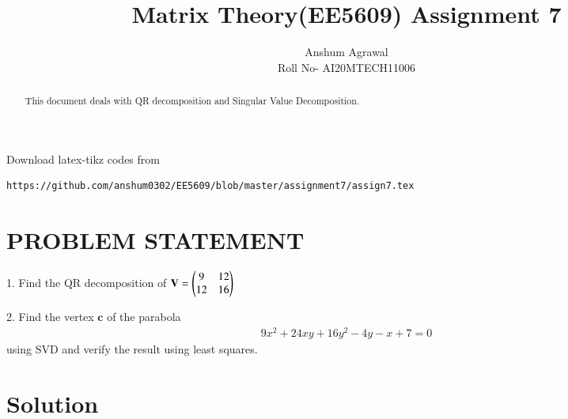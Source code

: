 \documentclass[journal,12pt,twocolumn]{IEEEtran}
\begin{document}
\makeatother
\let\StandardTheFigure\thefigure
\let\vec\mathbf
\renewcommand{\thefigure}{\theproblem}
\def\putbox#1#2#3{\makebox[0in][l]{\makebox[#1][l]{}\raisebox{\baselineskip}[0in][0in]{\raisebox{#2}[0in][0in]{#3}}}}
     \def\rightbox#1{\makebox[0in][r]{#1}}
     \def\centbox#1{\makebox[0in]{#1}}
     \def\topbox#1{\raisebox{-\baselineskip}[0in][0in]{#1}}
     \def\midbox#1{\raisebox{-0.5\baselineskip}[0in][0in]{#1}}
\vspace{3cm}
\title{Matrix Theory(EE5609) Assignment 7}
\author{Anshum Agrawal \\ Roll No- AI20MTECH11006}
%
\maketitle
\newpage
\bigskip
\renewcommand{\thefigure}{\theenumi}
\renewcommand{\thetable}{\theenumi}
\begin{abstract}
   This document deals with QR decomposition and Singular Value Decomposition.
\end{abstract}
%
Download latex-tikz codes from 
%
\begin{lstlisting}
https://github.com/anshum0302/EE5609/blob/master/assignment7/assign7.tex
\end{lstlisting}
%
\section{\textbf{PROBLEM STATEMENT}}
1. Find the QR decomposition of $\vec{V} = \myvec{9&12\\12&16}$

2. Find the vertex $\vec{c}$ of the parabola
\begin{align}
    9x^2+24xy+16y^2-4y-x+7=0\label{eq1}
\end{align}
using SVD and verify the result using least squares. 
\section{\textbf{Solution}}
\end{document}
